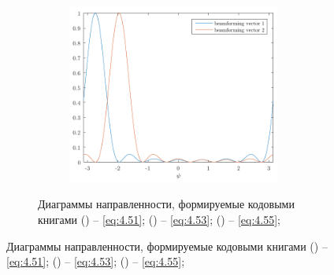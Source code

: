 \begin{figure}[h!]
\begin{figure}[ht!]
\begin{subfigure}{0.49\linewidth}
    \caption{}
    \label{fig:4.21}
\end{subfigure}
\begin{subfigure}{0.49\linewidth}
    \centering
    \includegraphics[width=\linewidth]{figs/fig4.22}
    \caption{}
    \label{fig:4.22}
\end{subfigure}
\caption{Диаграммы направленности, формируемые кодовыми книгами 
() -- \eqref{eq:4.51};
() -- \eqref{eq:4.53};
() -- \eqref{eq:4.55};
}
\label{fig:4.21-full}
\end{figure}


\end{figure}
